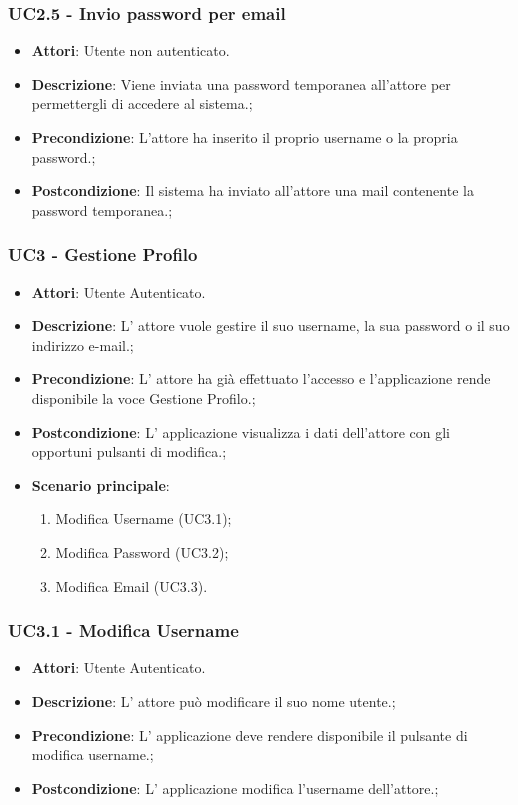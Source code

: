 \subsubsection{UC2.5 - Invio password per email} 
\label{sssec:UC2.5} 
\begin{itemize} 
\item \textbf{Attori}: Utente non autenticato.
\item \textbf{Descrizione}: Viene inviata una password temporanea all'attore per permettergli di accedere al sistema.;
\item \textbf{Precondizione}: L'attore ha inserito il proprio username o la propria password.;
\item \textbf{Postcondizione}: Il sistema ha inviato all'attore una mail contenente la password temporanea.;
\end{itemize} 
\subsubsection{UC3 - Gestione Profilo} 
\label{sssec:UC3} 
\begin{itemize} 
\item \textbf{Attori}: Utente Autenticato.
\item \textbf{Descrizione}: L' attore vuole gestire il suo username, la sua password o il suo indirizzo e-mail.;
\item \textbf{Precondizione}: L' attore ha già effettuato l'accesso e l'applicazione rende disponibile la voce Gestione Profilo.;
\item \textbf{Postcondizione}: L' applicazione visualizza i dati dell'attore con gli opportuni pulsanti di modifica.;
\item \textbf{Scenario principale}: \begin{enumerate}\item Modifica Username (UC3.1);\item Modifica Password (UC3.2);\item Modifica Email (UC3.3). 
 \end{enumerate}
\end{itemize} 
\subsubsection{UC3.1 - Modifica Username} 
\label{sssec:UC3.1} 
\begin{itemize} 
\item \textbf{Attori}: Utente Autenticato.
\item \textbf{Descrizione}: L' attore può modificare il suo nome utente.;
\item \textbf{Precondizione}: L' applicazione deve rendere disponibile il pulsante di modifica username.;
\item \textbf{Postcondizione}: L' applicazione modifica l'username dell'attore.;
\end{itemize} 
